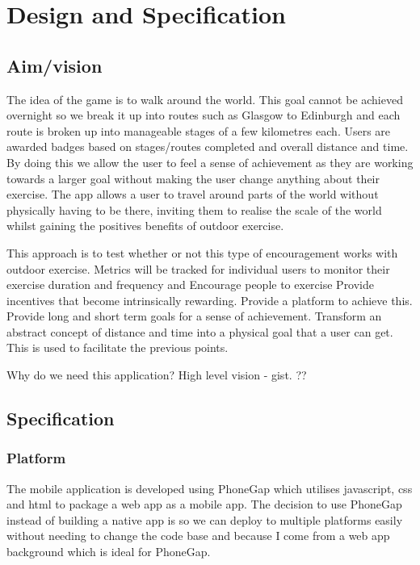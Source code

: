 \chapter{Design and Specification}\label{ch_method}

\section{Aim/vision}

The idea of the game is to walk around the world. This goal cannot be achieved overnight so we break it up into routes such as Glasgow to Edinburgh and each route is broken up into manageable stages of a few kilometres each. Users are awarded badges based on stages/routes completed and overall distance and time. By doing this we allow the user to feel a sense of achievement as they are working towards a larger goal without making the user change anything about their exercise. The app allows a user to travel around parts of the world without physically having to be there, inviting them to realise the scale of the world whilst gaining the positives benefits of outdoor exercise. 

This approach is to test whether or not this type of encouragement works with outdoor exercise. Metrics will be tracked for individual users to monitor their exercise duration and frequency and 
Encourage people to exercise
Provide incentives that become intrinsically rewarding.  
Provide a platform to achieve this.
Provide long and short term goals for a sense of achievement. 
Transform an abstract concept of distance and time into a physical goal that a user can get. This is used to facilitate the previous points.

Why do we need this application? High level vision - gist.
??



\section{Specification}
\subsection{Platform}
The mobile application is developed using PhoneGap which utilises javascript, css and html to package a web app as a mobile app. The decision to use PhoneGap instead of building a native app is so we can deploy to multiple platforms easily without needing to change the code base and because I come from a web app background which is ideal for PhoneGap.

